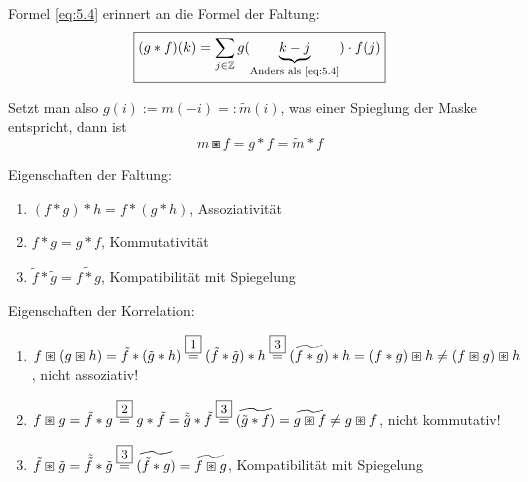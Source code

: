 \documentclass{article}
\theoremstyle{plain}
\theoremstyle{definition}
\numberwithin{equation}{section}
\newcommand{\Z}[0] {
    \mathbb Z
}
\begin{document}
        Formel \eqref{eq:5.4} erinnert an die Formel der Faltung:
        \begin{equation}\label{eq:5.5}
            \framebox{$\displaystyle (g * f)(k) = \sum_{j \in \Z} g(\underbrace{k-j}_{\text{Anders als \eqref{eq:5.4}}}) \cdot f(j)$}
        \end{equation}

        Setzt man also $g(i) := m(-i) =: \tilde m(i)$, was einer Spieglung der Maske entspricht, dann ist
        \[m \boxast f = g * f = \tilde m * f\]

        Eigenschaften der Faltung:
        \begin{enumerate}[label=\framebox{\arabic *}]
            \item $(f * g) * h = f * (g* h)$, Assoziativität
            \item $f*g=g*f$, Kommutativität
            \item $\tilde f * \tilde g = \widetilde{f * g}$, Kompatibilität mit Spiegelung
        \end{enumerate}
        Eigenschaften der Korrelation:
        \begin{enumerate}[label=\framebox{\arabic *'}]
            \item $f \boxast (g \boxast h) = \tilde f * ( \tilde g* h) \overset{\framebox{\small 1}}{=} ( \tilde f * \tilde g) * h \overset{\framebox{\small 3}}{=} (\widetilde{f * g}) * h = (f * g) \boxast h \neq (f \boxast g) \boxast h$, nicht assoziativ!
            \item $f \boxast g = \tilde f * g \overset{\framebox{\small 2}}{=} g * \tilde f = \tilde{\tilde g} * \tilde f \overset{\framebox{\small 3}}{=} \widetilde{(\tilde g * f)} = \widetilde{g \boxast f} \neq g \boxast f$, nicht kommutativ!
            \item $\tilde f \boxast \tilde g = \tilde{\tilde f} * \tilde g \overset{\framebox{\small 3}}{=} \widetilde{(\tilde f * g)} = \widetilde{f \boxast g}$, Kompatibilität mit Spiegelung
        \end{enumerate}


    \printindex
    
\end{document}
